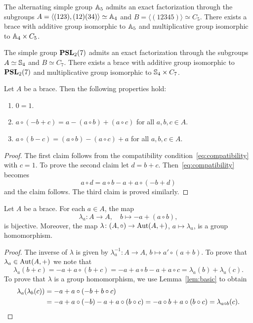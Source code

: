 \begin{example} 
	\label{exa:a5a4c5}
	The alternating simple group $\mathbb{A}_5$ admits an exact factorization
  through the subgroups 
  $A=\langle (123),(12)(34)\rangle\simeq\mathbb{A}_4$ and 
  $B=\langle(12345)\rangle\simeq C_5$.  
  There exists a brace with additive group isomorphic to $\mathbb{A}_5$ and multiplicative
  group isomorphic to $\mathbb{A}_4\times C_5$. 
\end{example}

\begin{example} 
	\label{exa:PSL27S4C7}
  The simple group $\mathbf{PSL}_2(7)$ admits an exact factorization through
  the subgroups $A\simeq\mathbb{S}_4$ and $B\simeq C_7$. 
  There exists a brace with additive
  group isomorphic to $\mathbf{PSL}_2(7)$ and multiplicative group isomorphic to 
  $\mathbb{S}_4\times C_7$.  
\end{example}

\begin{lemma}
    \label{lem:basic}
	Let $A$ be a brace. Then the following properties hold:
    \begin{enumerate}
        \item $0=1$.  
        \item $a\circ(-b+c)=a-(a\circ b)+(a\circ c)$ for all $a,b,c\in A$.
        \item $a\circ(b-c)=(a\circ b)-(a\circ c)+a$ for all $a,b,c\in A$.
    \end{enumerate}
\end{lemma}

\begin{proof}
		The first claim follows from the compatibility condition~\eqref{eq:compatibility} with
		$c=1$.  To prove the second claim let $d=b+c$.
		Then~\eqref{eq:compatibility} becomes 
		\[
		a\circ d =a\circ b-a+a\circ (-b+d)
		\]
		and the claim follows. The third claim is
		proved similarly.
\end{proof}

\begin{proposition}
\label{pro:lambda}
    Let $A$ be a brace. For each $a\in A$, the map
    \[
        \lambda_a\colon A\to A,\quad
        b\mapsto -a+(a\circ b),
    \]
    is bijective. Moreover, the map 
    $\lambda\colon (A,\circ)\to\operatorname{Aut}(A,+)$, $a\mapsto\lambda_a$, is a group homomorphism. 
\end{proposition}

\begin{proof}
The inverse of $\lambda$ is given by $\lambda^{-1}_a\colon A\to A$, $b\mapsto a'\circ (a+b)$. To prove
that $\lambda_a\in\operatorname{Aut}(A,+)$ we note that
\[
\lambda_a(b+c)=-a+a\circ(b+c)=-a+a\circ b-a+a\circ c=\lambda_a(b)+\lambda_a(c).
\]
To prove that $\lambda$ is a group homomorphism, we 
use Lemma~\ref{lem:basic} to obtain
\begin{align*}
\lambda_a(\lambda_b(c))&=-a+a\circ (-b+b\circ c)\\
&=-a+a\circ(-b)-a+a\circ (b\circ c)=-a\circ b+a\circ (b\circ c)=\lambda_{a\circ b}(c).\qedhere    
\end{align*}
\end{proof}

